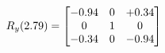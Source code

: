 \documentclass[preview]{standalone}
\begin{document}
\begin{align*}
\special{dvisvgm:raw <g id='unique000'>}R_{y}(2.79) = \begin{bmatrix}-0.94 & 0 & +0.34 \\0 & 1 & 0 \\-0.34 & 0 & -0.94\end{bmatrix}\special{dvisvgm:raw </g>}
\end{align*}
\end{document}
